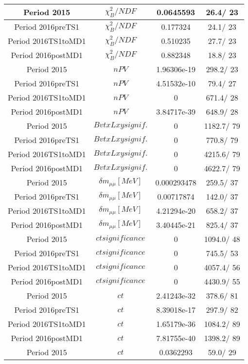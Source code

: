 \documentclass{article}
\begin{document}
\begin{longtable}{c|c|c|c}
\hline
 Period 2015 & $\chi^{2}_{B}/NDF$ & 0.0645593 &  26.4/ 23\\
\hline
 Period 2016preTS1 & $\chi^{2}_{B}/NDF$ & 0.177324 &  24.1/ 23\\
\hline
 Period 2016TS1toMD1 & $\chi^{2}_{B}/NDF$ & 0.510235 &  27.7/ 23\\
\hline
 Period 2016postMD1 & $\chi^{2}_{B}/NDF$ & 0.882348 &  18.8/ 23\\
\hline
 Period 2015 & $nPV$ & 1.96306e-19 & 298.2/ 23\\
\hline
 Period 2016preTS1 & $nPV$ & 4.51532e-10 &  79.4/ 27\\
\hline
 Period 2016TS1toMD1 & $nPV$ & 0 & 671.4/ 28\\
\hline
 Period 2016postMD1 & $nPV$ & 3.84717e-39 & 648.9/ 28\\
\hline
 Period 2015 & $BvtxLxy signif.$ & 0 & 1182.7/ 79\\
\hline
 Period 2016preTS1 & $BvtxLxy signif.$ & 0 & 770.8/ 79\\
\hline
 Period 2016TS1toMD1 & $BvtxLxy signif.$ & 0 & 4215.6/ 79\\
\hline
 Period 2016postMD1 & $BvtxLxy signif.$ & 0 & 4622.7/ 79\\
\hline
 Period 2015 & $\delta m_{\mu\mu} [MeV]$ & 0.000293478 & 259.5/ 37\\
\hline
 Period 2016preTS1 & $\delta m_{\mu\mu} [MeV]$ & 0.00717874 & 142.0/ 37\\
\hline
 Period 2016TS1toMD1 & $\delta m_{\mu\mu} [MeV]$ & 4.21294e-20 & 658.2/ 37\\
\hline
 Period 2016postMD1 & $\delta m_{\mu\mu} [MeV]$ & 3.40445e-21 & 825.4/ 37\\
\hline
 Period 2015 & $ct significance$ & 0 & 1094.0/ 48\\
\hline
 Period 2016preTS1 & $ct significance$ & 0 & 745.5/ 53\\
\hline
 Period 2016TS1toMD1 & $ct significance$ & 0 & 4057.4/ 56\\
\hline
 Period 2016postMD1 & $ct significance$ & 0 & 4430.9/ 55\\
\hline
 Period 2015 & $ct$ & 2.41243e-32 & 378.6/ 81\\
\hline
 Period 2016preTS1 & $ct$ & 8.39018e-17 & 297.9/ 82\\
\hline
 Period 2016TS1toMD1 & $ct$ & 1.65179e-36 & 1084.2/ 89\\
\hline
 Period 2016postMD1 & $ct$ & 7.81755e-40 & 1398.2/ 89\\
\hline
 Period 2015 & $ct$ & 0.0362293 &  59.0/ 29\\

\end{longtable}
\end{document}
